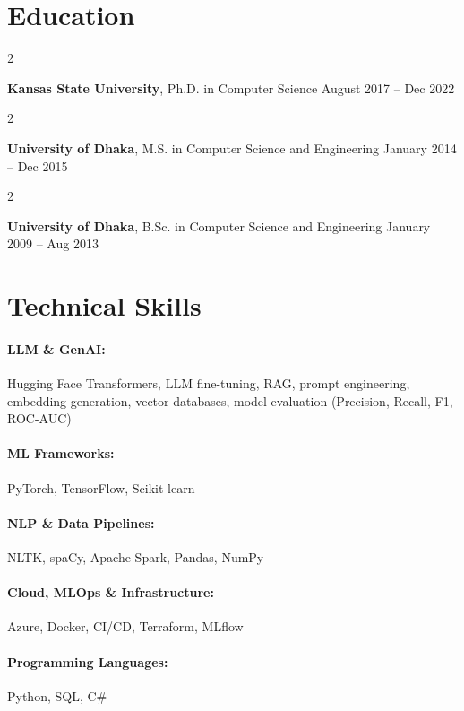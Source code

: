 \documentclass[10pt, letterpaper]{article}
\newenvironment{twocolentry}[2][]{
    \onecolentry
    \def\secondColumn{#2}
    \setcolumnwidth{\fill, 4.5 cm}
    \begin{paracol}{2}
}{
    \switchcolumn \raggedleft \secondColumn
    \end{paracol}
    \endonecolentry
}
\begin{document}
\section{Education}

        \begin{twocolentry}{
            August 2017 -- Dec 2022
        }
            \textbf{Kansas State University}, Ph.D. in Computer Science\end{twocolentry}

        \begin{twocolentry}{
            January 2014 -- Dec 2015
        }
            \textbf{University of Dhaka}, M.S. in Computer Science and Engineering\end{twocolentry}

        \begin{twocolentry}{
            January 2009 -- Aug 2013
        }
            \textbf{University of Dhaka}, B.Sc. in Computer Science and Engineering\end{twocolentry}

\vspace{-1mm}
\section{Technical Skills}

        \paragraph{LLM \& GenAI:} Hugging Face Transformers, LLM fine-tuning, RAG, prompt engineering, embedding generation, vector databases, model evaluation (Precision, Recall, F1, ROC-AUC)
        \vspace{-4mm}
        \paragraph{ML Frameworks:} PyTorch, TensorFlow, Scikit-learn
        \vspace{-4mm}
        \paragraph{NLP \& Data Pipelines:} NLTK, spaCy, Apache Spark, Pandas, NumPy
        \vspace{-4mm}
        \paragraph{Cloud, MLOps \& Infrastructure:} Azure, Docker, CI/CD, Terraform, MLflow
        \vspace{-4mm}
        \paragraph{Programming Languages:} Python, SQL, C\#
\end{document}
